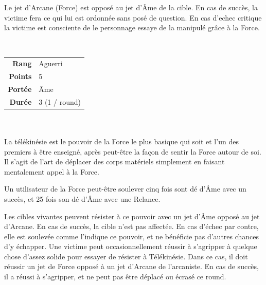 \begin{description}[align=left]
		Le jet d'Arcane (Force) est opposé au jet d'\^Ame de la cible. En cas de succès, la victime fera ce qui lui est ordonnée sans posé de question. En cas d'echec critique la victime est consciente de le personnage essaye de la manipulé grâce à la Force.
        \\

    \item [Télékinésie] ~ \\

        \begin{tabular}{ r l }
            \textbf{Rang}    & Aguerri \\
            \textbf{Points}  & 5 \\
            \textbf{Portée}  & \^Ame \\
            \textbf{Durée}   & 3 (1 / round) \\
        \end{tabular}
        \\ \\
        La télékinésie est le pouvoir de la Force le plus basique qui soit et l'un des premiers à être enseigné, après peut-être la façon de sentir la Force autour de soi. Il s'agit de l'art de déplacer des corps matériels simplement en faisant mentalement appel à la Force.

        Un utilisateur de la Force peut-être soulever cinq fois sont dé d’\^Ame avec un succès, et 25 fois son dé d’\^Ame avec une Relance.

        Les cibles vivantes peuvent résister à ce pouvoir avec un jet d’\^Ame opposé au jet d’Arcane. En cas de succès, la cible n’est pas affectée. En cas d’échec par contre, elle est soulevée comme l’indique ce pouvoir, et ne bénéficie pas d’autres chances d’y échapper. Une victime peut occasionnellement réussir à s’agripper à quelque chose d’assez solide pour essayer de résister à Télékinésie. Dans ce cas, il doit réussir un jet de Force opposé à un jet d’Arcane de l’arcaniste. En cas de succès, il a réussi à s’agripper, et ne peut pas être déplacé ou écrasé ce round.
        \\

    \item [Télépathie] ~ \\


\end{description}
